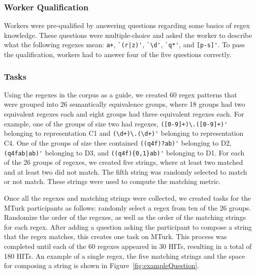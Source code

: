 \subsubsection{Worker Qualification}
Workers were pre-qualified by answering questions regarding some basics of regex knowledge. These questions were multiple-choice and asked the worker to describe what the following regexes mean: \verb!a+!, \verb!`(r|z)'!, \verb!`\d'!, \verb!`q*'!, and \verb![p-s]'!. To pass the qualification, workers had to answer four of the five questions correctly.

\subsubsection{Tasks}
Using the regexes in the corpus as a guide, we created 60 regex patterns that were grouped into 26 semantically equivalence groups, where 18 groups had two equivalent regexes each and eight groups had three equivalent regexes each. For example, one of the groups of size two had regexes, \verb!([0-9]+)\.([0-9]+)'! belonging to representation C1 and \verb!(\d+)\.(\d+)'! belonging to representation C4. One of the groups of size thee contained \verb!((q4f)?ab)'! belonging to D2, \verb!(q4fab|ab)'! belonging to D3, and \verb!((q4f){0,1}ab)'! belonging to D1. 
For each of the 26 groups of regexes, we created five strings, where at least two matched and at least two did not match. The fifth string was randomly selected to match or not match. These strings were used to compute the matching metric. 

Once all the regexes and matching strings were collected, we created tasks for the MTurk participants as follows: randomly select a regex from ten of the 26 groups. Randomize the order of the regexes, as well as the order of the matching strings for each regex. After adding a question asking the participant to compose a string that the regex matches, this creates one task on MTurk.   This process was completed until each of the 60 regexes appeared in 30 HITs, resulting in a total of 180 HITs.
An example of a single regex, the five matching strings and the space for composing a string is shown in Figure~\ref{fig:exampleQuestion}.


